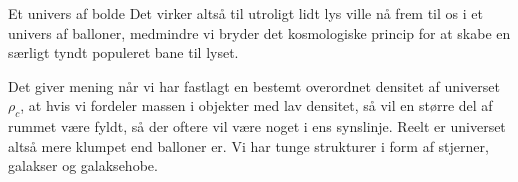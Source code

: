 \documentclass[crop=false, class=memoir]{standalone}
\begin{document}
\begin{opgave}{Et univers af bolde}
Det virker altså til utroligt lidt lys ville nå frem til os i et univers af balloner, medmindre vi bryder det kosmologiske princip for at skabe en særligt tyndt populeret bane til lyset. 

Det giver mening når vi har fastlagt en bestemt overordnet densitet af universet $\rho_c$, at hvis vi fordeler massen i objekter med lav densitet, så vil en større del af rummet være fyldt, så der oftere vil være noget i ens synslinje. Reelt er universet altså mere klumpet end balloner er. Vi har tunge strukturer i form af stjerner, galakser og galaksehobe. 

\end{opgave}
\end{document}
